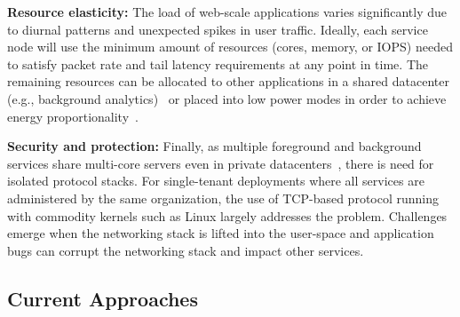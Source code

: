 {\bf Resource elasticity:} The load of web-scale applications varies
significantly due to diurnal patterns and unexpected spikes in user
traffic. Ideally, each service node will use the minimum amount of
resources (cores, memory, or IOPS) needed to satisfy packet rate and
tail latency requirements at any point in time. The remaining
resources can be allocated to other applications in a shared
datacenter (e.g., background
analytics)~\cite{Hindman:2011:MPF,DBLP:conf/asplos/DelimitrouK14,Leverich:RHSU:2014}
or placed into low power modes in order to achieve energy
proportionality~\cite{DBLP:journals/computer/BarrosoH07}.


{\bf Security and protection:} Finally, as multiple foreground and
background services share multi-core servers even in private
datacenters~\cite{Schwarzkopf:2013:OFS,DBLP:journals/cacm/DeanB13},
there is need for isolated protocol stacks. For single-tenant
deployments where all services are administered by the same
organization, the use of TCP-based protocol running with commodity
kernels such as Linux largely addresses the problem.  Challenges
emerge when the networking stack is lifted into the user-space and
application bugs can corrupt the networking stack and impact other
services.


\subsection{Current Approaches}
\label{sec:motivation:current}


